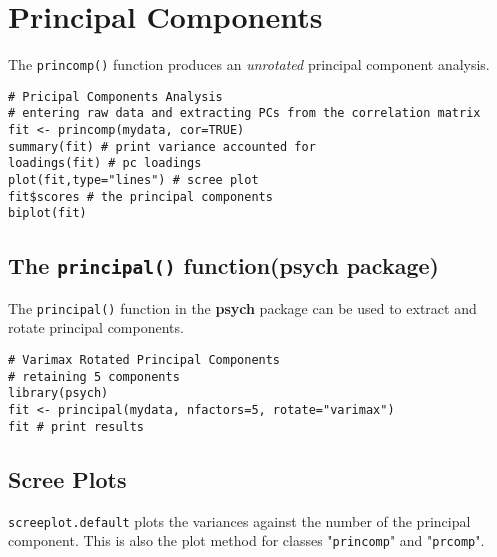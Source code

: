 \documentclass[a4paper,12pt]{article}
\begin{document}
\section{Principal Components}

The \texttt{princomp()} function produces an \textit{unrotated} principal component analysis.

\begin{framed}
\begin{verbatim}
# Pricipal Components Analysis
# entering raw data and extracting PCs from the correlation matrix 
fit <- princomp(mydata, cor=TRUE)
summary(fit) # print variance accounted for 
loadings(fit) # pc loadings 
plot(fit,type="lines") # scree plot 
fit$scores # the principal components
biplot(fit)
\end{verbatim}
\end{framed}

\subsection{The \texttt{principal()} function(psych package) }
The \texttt{principal()} function in the \textbf{psych }package can be used to extract and rotate principal components.
\begin{framed}
\begin{verbatim}
# Varimax Rotated Principal Components
# retaining 5 components 
library(psych)
fit <- principal(mydata, nfactors=5, rotate="varimax")
fit # print results
\end{verbatim}
\end{framed}
\subsection{Scree Plots}
\texttt{screeplot.default} plots the variances against the number of the principal component. This is also the plot method for classes "\texttt{princomp}" and "\texttt{prcomp}".
\end{document}
